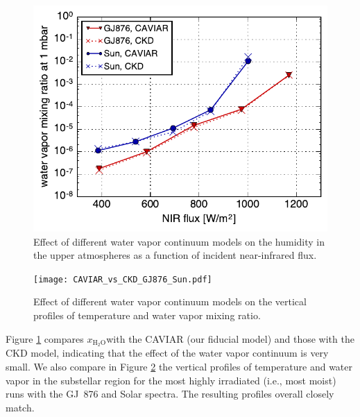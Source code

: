 \documentclass[11pt,numberedappendix,twocolappendix,]{emulateapj}
\def\water{H$_2$O}
\def\xwater{$x_\text{\water}$}
\begin{document}
{%
\begin{figure}[!b]
    \begin{center}
    \includegraphics[width=0.9\hsize]{xH2O_CAVIAR_vs_CKD.pdf}
    \end{center}
\caption{Effect of different water vapor continuum models on the humidity in the upper atmospheres as a function of incident near-infrared flux. \color{red}{Mean to update...}}
\label{fig:xH2O_CAVIAR_vs_CKD}
\end{figure}

\begin{figure}[!h]
    \begin{center}
    \texttt{[image: CAVIAR\_vs\_CKD\_GJ876\_Sun.pdf]}
    \end{center}
\caption{Effect of different water vapor continuum models on the vertical profiles of temperature and water vapor mixing ratio. }
\label{fig:CAVIAR_vs_CKD_GJ876_Sun}
\end{figure}


%
Figure \ref{fig:xH2O_CAVIAR_vs_CKD} compares \xwater with the CAVIAR (our fiducial model) and those with the CKD model, indicating that the effect of the water vapor continuum is very small. 
%
We also compare in Figure \ref{fig:CAVIAR_vs_CKD_GJ876_Sun} the vertical profiles of temperature and water vapor in the substellar region for the most highly irradiated (i.e., most moist) runs with the GJ~876 and Solar spectra. 
The resulting profiles overall closely match. 

}
\end{document}
